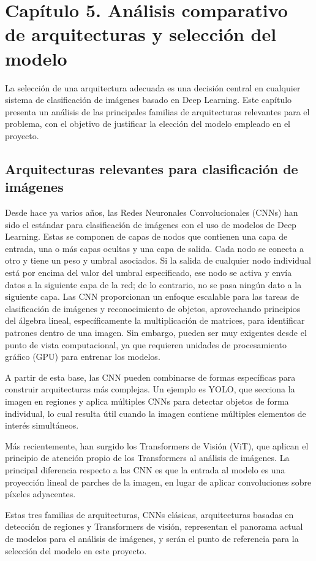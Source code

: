 \newpage

\section*{Capítulo 5. Análisis comparativo de arquitecturas y selección del modelo}

La selección de una arquitectura adecuada es una decisión central en cualquier sistema de clasificación de imágenes basado en Deep Learning. Este capítulo presenta un análisis de las principales familias de arquitecturas relevantes para el problema, con el objetivo de justificar la elección del modelo empleado en el proyecto.

\setcounter{section}{5}
\setcounter{subsection}{0}

\subsection{Arquitecturas relevantes para clasificación de imágenes}
Desde hace ya varios años, las Redes Neuronales Convolucionales (CNNs) han sido el estándar para clasificación de imágenes con el uso de modelos de Deep Learning. Estas se componen de capas de nodos que contienen una capa de entrada, una o más capas ocultas y una capa de salida. Cada nodo se conecta a otro y tiene un peso y umbral asociados. Si la salida de cualquier nodo individual está por encima del valor del umbral especificado, ese nodo se activa y envía datos a la siguiente capa de la red; de lo contrario, no se pasa ningún dato a la siguiente capa.
Las CNN proporcionan un enfoque escalable para las tareas de clasificación de imágenes y reconocimiento de objetos, aprovechando principios del álgebra lineal, específicamente la multiplicación de matrices, para identificar patrones dentro de una imagen. Sin embargo, pueden ser muy exigentes desde el punto de vista computacional, ya que requieren unidades de procesamiento gráfico (GPU) para entrenar los modelos\cite{ibm2025cnn}.

A partir de esta base, las CNN pueden combinarse de formas específicas para construir arquitecturas más complejas. Un ejemplo es YOLO, que secciona la imagen en regiones y aplica múltiples CNNs para detectar objetos de forma individual, lo cual resulta útil cuando la imagen contiene múltiples elementos de interés simultáneos.

Más recientemente, han surgido los Transformers de Visión (ViT), que aplican el principio de atención propio de los Transformers al análisis de imágenes. La principal diferencia respecto a las CNN es que la entrada al modelo es una proyección lineal de parches de la imagen, en lugar de aplicar convoluciones sobre píxeles adyacentes\cite{alka1974_2025vit}.

Estas tres familias de arquitecturas, CNNs clásicas, arquitecturas basadas en detección de regiones y Transformers de visión, representan el panorama actual de modelos para el análisis de imágenes, y serán el punto de referencia para la selección del modelo en este proyecto.